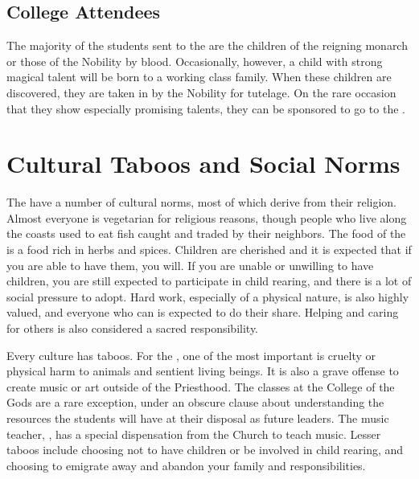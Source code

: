 \documentclass[blue]{GL2020}
\begin{document}
\subsection*{College Attendees}
The majority of the students sent to the \pSchool{} are the children of the reigning monarch or those of the Nobility by blood.  Occasionally, however, a child with strong magical talent will be born to a working class family.  When these children are discovered, they are taken in by the Nobility for tutelage.  On the rare occasion that they show especially promising talents, they can be sponsored to go to the \pSchool{}.

\section*{Cultural Taboos and Social Norms}
The \pFarm{} have a number of cultural norms, most of which derive from their religion.  Almost everyone is vegetarian for religious reasons, though people who live along the coasts used to eat fish caught and traded by their \pShip{} neighbors.  The food of the \pFarm{} is a food rich in herbs and spices.  Children are cherished and it is expected that if you are able to have them, you will.  If you are unable or unwilling to have children, you are still expected to participate in child rearing, and there is a lot of social pressure to adopt.  Hard work, especially of a physical nature, is also highly valued, and everyone who can is expected to do their share.  Helping and caring for others is also considered a sacred responsibility.

Every culture has taboos.  For the \pFarmers{}, one of the most important is cruelty or physical harm to animals and sentient living beings.  It is also a grave offense to create music or art outside of the Priesthood.  The classes at the College of the Gods are a rare exception, under an obscure clause about understanding the resources the students will have at their disposal as future leaders.  The music teacher, \cMusic{\full}, has a special dispensation from the Church to teach music.  Lesser taboos include choosing not to have children or be involved in child rearing, and choosing to emigrate away and abandon your family and responsibilities.
\end{document}
